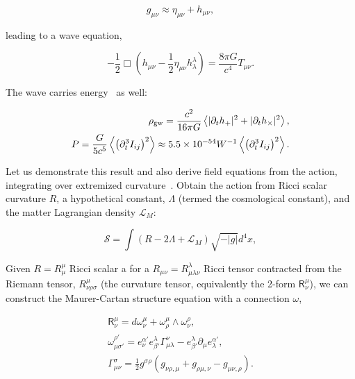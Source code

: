 \begin{equation}
g_{\mu \nu} \approx \eta_{\mu \nu} + h_{\mu \nu},
\end{equation}

\noindent leading to a wave equation,

\begin{equation}
-\frac{1}{2} \Box \left(h_{\mu \nu} - \frac{1}{2} \eta_{\mu \nu} h_{\lambda}^{\lambda} \right) = \frac{8 \pi G}{c^4} T_{\mu \nu}.
\end{equation}

The wave carries energy~\cite{BallmerThesis} as well:

\begin{eqnarray}
\rho_{\textup{gw}} = \frac{c^2}{16 \pi G} \left\langle |\partial_t h_+|^2 + |\partial_t h_\times|^2 \right\rangle,\\
P = \frac{G}{5c^5}\left\langle \left( \partial_t^3 I_{ij}\right)^2  \right\rangle \approx 5.5\times 10^{-54} W^{-1} \left\langle \left( \partial_t^3 I_{ij}\right)^2  \right\rangle.
\end{eqnarray}

Let us demonstrate this result and also derive field equations from the action, integrating over extremized curvature~\cite{FarrThesis}.
Obtain the action from Ricci scalar curvature $R$, a hypothetical constant, $\Lambda$ (termed the cosmological constant), and the matter Lagrangian density $\mathcal{L}_M$:

\begin{equation}
\mathcal{S} = \int \left( R - 2\Lambda + \mathcal{L}_M \right) \sqrt{-|g|}d^4 x,
\end{equation}

Given $R = R^\mu_\mu$ Ricci scalar a for a $R_{\mu\nu} = R^\lambda_{\mu\lambda\nu}$ Ricci tensor contracted from the Riemann tensor, $R^\mu_{\nu\rho\sigma}$ (the curvature tensor, equivalently the 2-form $\textsf{R}^\mu_\nu$), we can construct the Maurer-Cartan structure equation with a connection $\omega$,

\begin{eqnarray}
\textsf{R}^\mu_\nu = d\omega^\mu_\nu + \omega^\mu_\rho \wedge \omega^\rho_\nu, \\
\omega^{\rho'}_{\mu\sigma'} = e^{\alpha'}_{\nu} e^{\lambda}_{\beta'} \Gamma^{\nu}_{\mu\lambda} - e^{\lambda}_{\beta'} \partial_{\mu} e^{\alpha'}_{\lambda},\\
\Gamma^\sigma_{\mu\nu} = \frac{1}{2} g^{\sigma\rho} \left( g_{\nu \rho, \mu} + g_{\rho \mu, \nu} - g_{\mu\nu,\rho} \right). 
\end{eqnarray}

